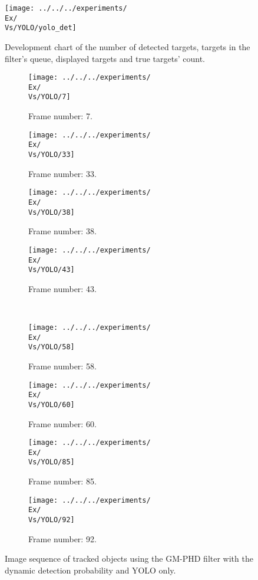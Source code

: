 \begin{figure}[H]
    \centering
    \texttt{[image: ../../../experiments/\\Ex/\\Vs/YOLO/yolo\_det]}
    \caption{Development chart of the number of detected targets, targets in the filter's queue, displayed targets and
    true targets' count.}
    \label{gr:\Ex-\Vs-\Set}
\end{figure}

\begin{figure}[H]
    \centering
    \begin{subfigure}{0.23\textwidth}
        \centering
        \texttt{[image: ../../../experiments/\\Ex/\\Vs/YOLO/7]}
        \caption{Frame number: 7.}
        \label{fig:\Ex-\Vs-\Set:01}
    \end{subfigure}
    \begin{subfigure}{0.23\textwidth}
        \centering
        \texttt{[image: ../../../experiments/\\Ex/\\Vs/YOLO/33]}
        \caption{Frame number: 33.}
        \label{fig:\Ex-\Vs-\Set:02}
    \end{subfigure}
    \begin{subfigure}{0.23\textwidth}
        \centering
        \texttt{[image: ../../../experiments/\\Ex/\\Vs/YOLO/38]}
        \caption{Frame number: 38.}
        \label{fig:\Ex-\Vs-\Set:03}
    \end{subfigure}
    \begin{subfigure}{0.23\textwidth}
        \centering
        \texttt{[image: ../../../experiments/\\Ex/\\Vs/YOLO/43]}
        \caption{Frame number: 43.}
        \label{fig:\Ex-\Vs-\Set:04}
    \end{subfigure}
    \\
    \begin{subfigure}{0.23\textwidth}
        \centering
        \texttt{[image: ../../../experiments/\\Ex/\\Vs/YOLO/58]}
        \caption{Frame number: 58.}
        \label{fig:\Ex-\Vs-\Set:05}
    \end{subfigure}
    \begin{subfigure}{0.23\textwidth}
        \centering
        \texttt{[image: ../../../experiments/\\Ex/\\Vs/YOLO/60]}
        \caption{Frame number: 60.}
        \label{fig:\Ex-\Vs-\Set:06}
    \end{subfigure}
    \begin{subfigure}{0.23\textwidth}
        \centering
        \texttt{[image: ../../../experiments/\\Ex/\\Vs/YOLO/85]}
        \caption{Frame number: 85.}
        \label{fig:\Ex-\Vs-\Set:07}
    \end{subfigure}
    \begin{subfigure}{0.23\textwidth}
        \centering
        \texttt{[image: ../../../experiments/\\Ex/\\Vs/YOLO/92]}
        \caption{Frame number: 92.}
        \label{fig:\Ex-\Vs-\Set:08}
    \end{subfigure}
    \caption{Image sequence of tracked objects using the GM-PHD filter with the dynamic detection probability and YOLO
    only.}
    \label{fig:\Ex-\Vs-\Set}
\end{figure}




